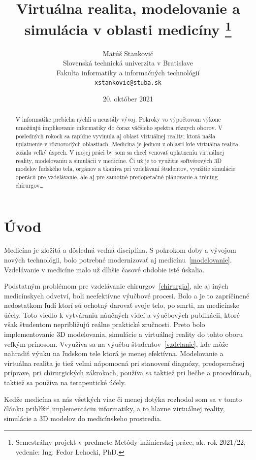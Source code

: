 \documentclass[10pt,twoside,slovak,a4paper]{article}
\title{Virtuálna realita, modelovanie a simulácia v oblasti medicíny 
\thanks{Semestrálny projekt v predmete Metódy inžinierskej práce, ak. rok 2021/22, vedenie: Ing. Fedor Lehocki, PhD.}} %
\author{Matúš Stankovič\\[2pt]
	{\small Slovenská technická univerzita v Bratislave}\\
	{\small Fakulta informatiky a informačných technológií}\\
	{\small \texttt{xstankovic@stuba.sk}}
	}
\date{\small 20. október 2021} %
\begin{document}
\maketitle

\begin{abstract}
V informatike prebieha rýchli a neustály vývoj. Pokroky vo výpočtovom výkone umožňujú 
implikovanie informatiky do čoraz väčšieho spektra rôznych oborov. V posledných rokoch sa 
rapídne vyvinula aj oblasť virtuálnej reality, ktorá našla uplatnenie v rôznorodých oblastiach. 
Medicína je jednou z oblastí kde virtuálna realita zožala veľký úspech. V mojej práci by som sa chcel 
venovať uplatneniu virtuálnej reality, modelovaniu a simulácii v medicíne. Či už je to 
využitie softvérových 3D modelov ľudského tela, orgánov a tkaniva pri vzdelávaní študentov, 
využitie simulácie operácii pre vzdelávanie, ale aj pre samotné predoperačné plánovanie a 
tréning chirurgov\ldots
\end{abstract}



\section{Úvod}
Medicína je zložitá a dôsledná vedná disciplína. S pokrokom doby a vývojom nových technológii, bolo potrebné modernizovať aj medicínu~\ref{modelovanie}. Vzdelávanie v medicíne malo už dlhšie časové obdobie isté úskalia.

Podstatným problémom pre vzdelávanie chirurgov~\ref{chirurgia}, ale aj iných medicínskych odvetví, boli neefektívne výučbové procesi. Bolo a je to zapríčinené nedostatkom ľudí ktorí sú ochotný darovať svoje telo, po smrti, na medicínske účely. Toto viedlo k vytváraniu náučných videí a výučbových publikácii, ktoré však študentom nepribližujú reálne praktické zručnosti. Preto bolo implementovanie 3D modelovania, simulácie a virtuálnej reality do tohto oboru veľkým prínosom. Vvyužíva sa na výučbu študentov~\ref{vzdelanie}, kde môže nahradiť výuku na ľudskom tele ktorá je menej efektívna. Modelovanie a virtuálna realita je tiež veľmi nápomocná pri stanovení diagnózy, predoperačnej príprave, pri chirurgických zákrokoch, používa sa taktiež pri liečbe a procedúrach, taktiež sa používa na terapeutické účely.

Keďže medicína sa nás všetkých viac či menej dotýka rozhodol som sa v tomto článku priblížiť implementáciu informatiky, a to hlavne virtuálnej reality, simulácie a 3D modelov do medicínskeho prostredia.  
\end{document}

